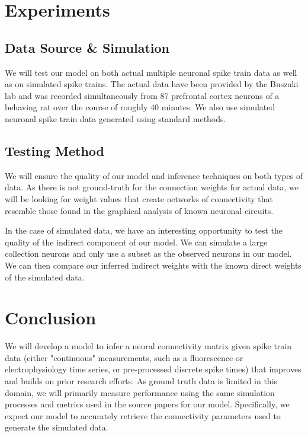 \documentclass{article}
\begin{document}
\section{Experiments}

\subsection{Data Source \& Simulation}

We will test our model on both actual multiple neuronal spike train data as well as on simulated spike trains. The actual data have been provided by the Buszaki lab and was recorded simultaneously from 87 prefrontal cortex neurons of a behaving rat over the course of roughly 40 minutes. We also use simulated neuronal spike train data generated using standard methods.

\subsection{Testing Method}

We will ensure the quality of our model and inference techniques on both types of data. As there is not ground-truth for the connection weights for actual data, we will be looking for weight values that create networks of connectivity that resemble those found in the graphical analysis of known neuronal circuits.

In the case of simulated data, we have an interesting opportunity to test the quality of the indirect component of our model. We can simulate a large collection neurons and only use a subset as the observed neurons in our model. We can then compare our inferred indirect weights with the known direct weights of the simulated data.

\section{Conclusion}
We will develop a model to infer a neural connectivity matrix given spike train data (either "continuous" measurements, such as a fluorescence or electrophysiology time series, or pre-processed discrete spike times) that improves and builds on prior research efforts. As ground truth data is limited in this domain, we will primarily measure performance using the same simulation processes and metrics used in the source papers for our model.  Specifically, we expect our model to accurately retrieve the connectivity parameters used to generate the simulated data.  
\end{document}
